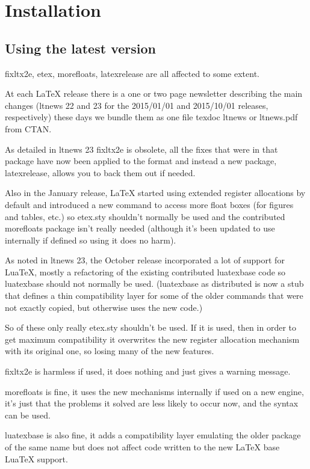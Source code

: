 \chapter{Installation}


\section{Using the latest version}

fixltx2e, etex, morefloats, latexrelease are all affected to some extent.

At each LaTeX release there is a one or two page newsletter describing the main changes (ltnews 22 and 23 for the 2015/01/01 and 2015/10/01 releases, respectively) these days we bundle them as one file texdoc ltnews or ltnews.pdf from CTAN.

As detailed in ltnews 23 fixltx2e is obsolete, all the fixes that were in that package have now been applied to the format and instead a new package, latexrelease, allows you to back them out if needed.

Also in the January release, LaTeX started using extended register allocations by default and introduced a new \extrafloats command to access more float boxes (for figures and tables, etc.) so etex.sty shouldn't normally be used and the contributed morefloats package isn't really needed (although it's been updated to use \extrafloats internally if defined so using it does no harm).

As noted in ltnews 23, the October release incorporated a lot of support for LuaTeX, mostly a refactoring of the existing contributed luatexbase code so luatexbase should not normally be used. (luatexbase as distributed is now a stub that defines a thin compatibility layer for some of the older commands that were not exactly copied, but otherwise uses the new code.)

So of these only really etex.sty shouldn't be used. If it is used, then in order to get maximum compatibility it overwrites the new register allocation mechanism with its original one, so losing many of the new features.

fixltx2e is harmless if used, it does nothing and just gives a warning message.

morefloats is fine, it uses the new mechanisms internally if used on a new engine, it's just that the problems it solved are less likely to occur now, and the \extrafloats syntax can be used.

luatexbase is also fine, it adds a compatibility layer emulating the older package of the same name but does not affect code written to the new LaTeX base LuaTeX support.